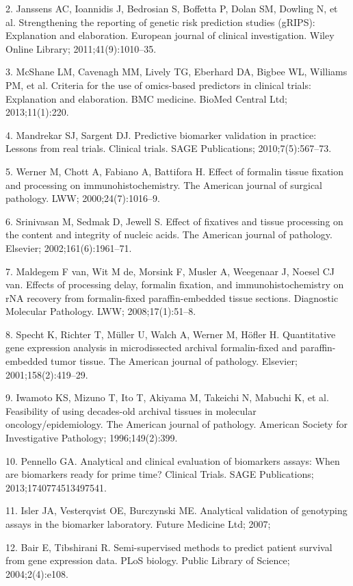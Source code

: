 \documentclass[11pt]{article}
\begin{document}
2. Janssens AC, Ioannidis J, Bedrosian S, Boffetta P, Dolan SM, Dowling
N, et al. Strengthening the reporting of genetic risk prediction studies
(gRIPS): Explanation and elaboration. European journal of clinical
investigation. Wiley Online Library; 2011;41(9):1010--35.

3. McShane LM, Cavenagh MM, Lively TG, Eberhard DA, Bigbee WL, Williams
PM, et al. Criteria for the use of omics-based predictors in clinical
trials: Explanation and elaboration. BMC medicine. BioMed Central Ltd;
2013;11(1):220.

4. Mandrekar SJ, Sargent DJ. Predictive biomarker validation in
practice: Lessons from real trials. Clinical trials. SAGE Publications;
2010;7(5):567--73.

5. Werner M, Chott A, Fabiano A, Battifora H. Effect of formalin tissue
fixation and processing on immunohistochemistry. The American journal of
surgical pathology. LWW; 2000;24(7):1016--9.

6. Srinivasan M, Sedmak D, Jewell S. Effect of fixatives and tissue
processing on the content and integrity of nucleic acids. The American
journal of pathology. Elsevier; 2002;161(6):1961--71.

7. Maldegem F van, Wit M de, Morsink F, Musler A, Weegenaar J, Noesel CJ
van. Effects of processing delay, formalin fixation, and
immunohistochemistry on rNA recovery from formalin-fixed
paraffin-embedded tissue sections. Diagnostic Molecular Pathology. LWW;
2008;17(1):51--8.

8. Specht K, Richter T, M{ü}ller U, Walch A, Werner M, H{ö}fler H.
Quantitative gene expression analysis in microdissected archival
formalin-fixed and paraffin-embedded tumor tissue. The American journal
of pathology. Elsevier; 2001;158(2):419--29.

9. Iwamoto KS, Mizuno T, Ito T, Akiyama M, Takeichi N, Mabuchi K, et al.
Feasibility of using decades-old archival tissues in molecular
oncology/epidemiology. The American journal of pathology. American
Society for Investigative Pathology; 1996;149(2):399.

10. Pennello GA. Analytical and clinical evaluation of biomarkers
assays: When are biomarkers ready for prime time? Clinical Trials. SAGE
Publications; 2013;1740774513497541.

11. Isler JA, Vesterqvist OE, Burczynski ME. Analytical validation of
genotyping assays in the biomarker laboratory. Future Medicine Ltd;
2007;

12. Bair E, Tibshirani R. Semi-supervised methods to predict patient
survival from gene expression data. PLoS biology. Public Library of
Science; 2004;2(4):e108.
\end{document}
